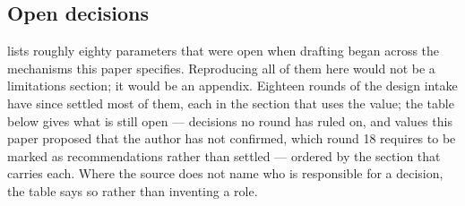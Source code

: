 \subsection{Open decisions}

 lists roughly eighty parameters that were open when drafting
began across the mechanisms this paper specifies. Reproducing all of them here would not be a
limitations section; it would be an appendix. Eighteen rounds of the design intake
 have since settled most of them, each in the section that uses the
value; the table below gives what is still open --- decisions no round has ruled on, and values this
paper proposed that the author has not confirmed, which round 18 requires to be marked as
recommendations rather than settled --- ordered by the section that carries each. Where the source does not
name who is responsible for a decision, the table says so rather than inventing a role.

